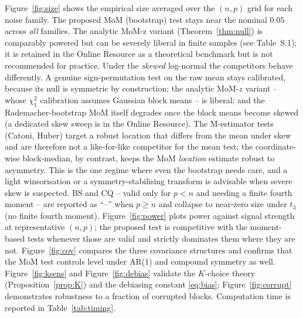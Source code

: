 \documentclass[pdflatex,sn-mathphys-num]{sn-jnl}
\theoremstyle{thmstyleone}%
\theoremstyle{thmstyletwo}%
\theoremstyle{thmstylethree}%
\begin{document}
Figure~\ref{fig:size} shows the empirical size averaged over the $(n,p)$ grid
for each noise family. The proposed MoM (bootstrap) test stays near the nominal
$0.05$ across \emph{all} families. The analytic MoM-z variant (Theorem~\ref{thm:null})
is comparably powered but can be severely liberal in finite samples (see
Table~S.1); it is retained in the Online Resource as a theoretical
benchmark but is not recommended for practice. Under the \emph{skewed} log-normal the competitors behave differently. A genuine
sign-permutation test on the raw mean stays calibrated, because its null is
symmetric by construction; the analytic MoM-$z$ variant -- whose $\chi^2_1$
calibration assumes Gaussian block means -- is liberal; and the Rademacher-bootstrap
MoM itself degrades once the block means become skewed (a dedicated skew sweep is
in the Online Resource). The M-estimator tests (Catoni, Huber) target a
robust location that differs from the mean under skew and are therefore not a
like-for-like competitor for the mean test; the coordinate-wise block-median, by
contrast, keeps the MoM \emph{location} estimate robust to asymmetry. This is the
one regime where even the bootstrap needs care, and a light winsorisation or a
symmetry-stabilising transform is advisable when severe skew is suspected.
BS and CQ -- valid only for $p<n$ and
needing a finite fourth moment -- are reported as ``--'' when $p\ge n$ and
collapse to near-zero size under $t_3$ (no finite fourth moment).
Figure~\ref{fig:power} plots power against signal strength at
representative $(n,p)$; the proposed test is competitive with the moment-based
tests whenever those are valid and strictly dominates them where they are not.
Figure~\ref{fig:cov} compares the three covariance structures and confirms that
the MoM test controls level under AR(1) and compound symmetry as well.
Figure~\ref{fig:ksens} and Figure~\ref{fig:debias} validate the $K$-choice theory
(Proposition~\ref{prop:K}) and the debiasing constant \eqref{eq:bias};
Figure~\ref{fig:corrupt} demonstrates robustness to a fraction of corrupted
blocks. Computation time is reported in Table~\ref{tab:timing}.
\end{document}
